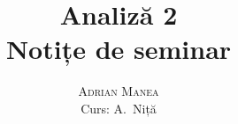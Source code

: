 \documentclass[12pt, a4paper]{book}
\begin{document}
\thispagestyle{empty}
\pagestyle{plain} %

\title{\huge\textbf{Analiză 2} \\ \Large{Notițe de seminar}}
\vspace{1cm}
\author{\Large\textsc{Adrian Manea} \\ \large{Curs: A.\ Niță}}

\maketitle

\tableofcontents

\setcounter{page}{1} %





\renewcommand{\indexname}{Index}
\printindex
\end{document}
